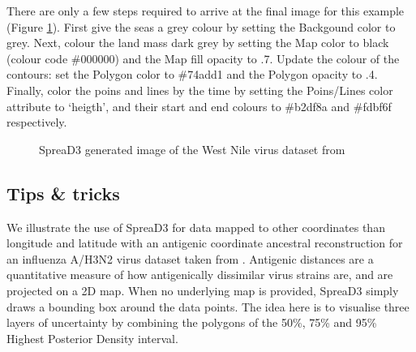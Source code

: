 \documentclass[english]{paper}
\begin{document}
There are only a few steps required to arrive at the final image for this example (Figure \ref{fig:TimeSliceFigure}).
First give the seas a grey colour by setting the Backgound color to grey.
Next, colour the land mass dark grey by setting the Map color to black (colour code \#000000) and the Map fill opacity to .7.
Update the colour of the contours: set the Polygon color  to \#74add1 and the Polygon opacity to .4.
Finally, color the poins and lines by the time by setting the Poins/Lines color attribute to `heigth', and their start and end colours to \#b2df8a and \#fdbf6f respectively.

\begin{figure}[!H]
\centering
\caption{SpreaD3 generated image of the West Nile virus dataset from \citet{Pybus:2012aa}}
\label{fig:TimeSliceFigure}
\end{figure}


\subsection{Tips \& tricks\label{sub:tips}}

% 

We illustrate the use of SpreaD3 for data mapped to other coordinates than longitude and latitude with an antigenic coordinate ancestral reconstruction for an influenza A/H3N2 virus dataset taken from \citet{Bedford:2014aa}.
Antigenic distances are a quantitative measure of how antigenically dissimilar virus strains are, and are projected on a 2D map.
When no underlying map is provided, SpreaD3 simply draws a bounding box around the data points.
The idea here is to visualise three layers of uncertainty by combining the polygons of the 50\%, 75\% and 95\% Highest Posterior Density interval.
\end{document}
